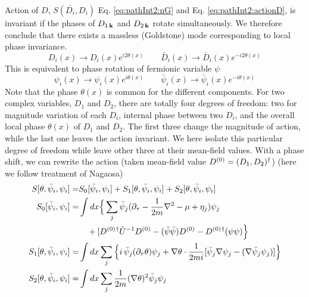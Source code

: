  Action of $D$, $S(\bar{D_i},D_i)$ Eq. \eqref{eq:pathInt2:nG} and Eq. \eqref{eq:pathInt2:actionD}, is invariant if the phases of $D_{1\,\mathbf{k}}$ and $D_{2\,\mathbf{k}}$ rotate simultaneously. We therefore conclude that there exists a massless (Goldstone) mode corresponding to local phase invariance. 
\begin{equation*}
D_{i}(x)\rightarrow{}D_{i}(x)e^{i2\theta(x)}\qquad{}
\bar{D}_{i}(x)\rightarrow{}\bar{D}_{i}(x)e^{-i2\theta(x)}
\end{equation*}
This is equivalent to  phase  rotation of fermionic variable $\psi$
\begin{equation*}
\psi_{i}(x)\rightarrow{}\psi_{i}(x)e^{i\theta(x)}\qquad{}
\bar{\psi}_{i}(x)\rightarrow{}\bar{\psi}_{i}(x)e^{-i\theta(x)}
\end{equation*}
Note that the phase $\theta(x)$ is common for the different components. For two complex variables, $D_1$ and $D_2$, there are totally four degrees of freedom: two for magnitude variation of each $D_i$,  internal phase between two $D_i$, and the overall local phase $\theta(x)$ of $D_1$ and $D_2$.  The first three change the magnitude of action, while the last one leaves the action invariant.  We here isolate this particular degree of freedom while leave other three at their mean-field values. With a phase shift, we can rewrite the action (taken mean-field value $D^{(0)}=(D_1,D_2)^{\dagger}$) (here we  follow treatment of Nagaosa\cite{Nagaosa})
\begin{subequations}
\begin{align}\label{eq:pathInt2:actionPhase}
S[\theta,\bar\psi_{i},\psi_{i}]=&S_0[\bar\psi_{i},\psi_{i}]+S_1[\theta,\bar\psi_{i},\psi_{i}]+S_2[\theta,\bar\psi_{i},\psi_{i}]\\
S_0[\bar\psi_{i},\psi_{i}]=&\int{dx}
\Big\{\sum_{j}\bar\psi_{j}(\partial_\tau-\frac{1}{2m}\nabla^{2}-\mu+\eta_{j})\psi_{j}\nonumber\\
&\quad+[D^{(0)}{}^{\dagger}\tilde{U}^{-1}D^{(0)}-(\bar\psi\bar\psi)D^{(0)}-{D^{(0)}}{}^{\dagger}(\psi\psi)\Big\}\\
S_1[\theta,\bar\psi_{i},\psi_{i}]=&\int{dx}\sum_{j}\Big\{
   i\,\bar\psi_{j}(\partial_{\tau}\theta)\psi_{j}+\nabla\theta\cdot\frac{1}{2mi}[\bar\psi_{j}\nabla\psi_{j}-(\nabla\bar{\psi}_{j}\psi_{j})]\Big\}\\
S_2[\theta,\bar\psi_{i},\psi_{i}]=&\int{dx}\sum_{j}\frac{1}{2m}(\nabla\theta)^{2}\bar\psi_{j}\psi_{j}
\end{align}
\end{subequations}
